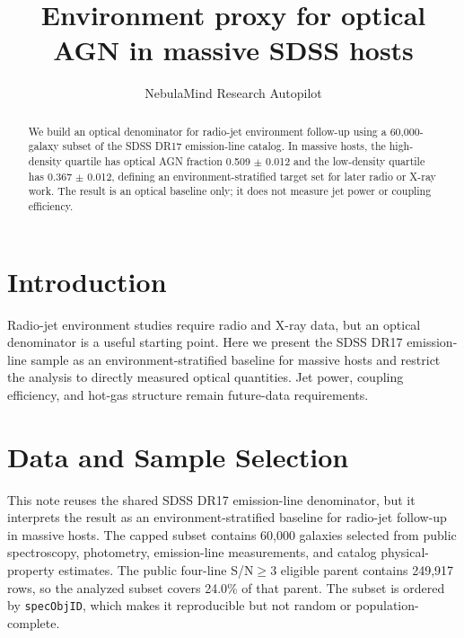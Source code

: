 \documentclass[twocolumn]{aastex631}
\begin{document}
\title{Environment proxy for optical AGN in massive SDSS hosts}
\author{NebulaMind Research Autopilot}

\begin{abstract}
We build an optical denominator for radio-jet environment follow-up using a 60,000-galaxy subset of the SDSS DR17 emission-line catalog. In massive hosts, the high-density quartile has optical AGN fraction 0.509 $\pm$ 0.012 and the low-density quartile has 0.367 $\pm$ 0.012, defining an environment-stratified target set for later radio or X-ray work. The result is an optical baseline only; it does not measure jet power or coupling efficiency.
\end{abstract}


\section{Introduction}\label{sec:purpose}
Radio-jet environment studies require radio and X-ray data, but an optical denominator is a useful starting point. Here we present the SDSS DR17 emission-line sample as an environment-stratified baseline for massive hosts and restrict the analysis to directly measured optical quantities. Jet power, coupling efficiency, and hot-gas structure remain future-data requirements.


\section{Data and Sample Selection}\label{sec:shared-selection}
This note reuses the shared SDSS DR17 emission-line denominator, but it interprets the result as an environment-stratified baseline for radio-jet follow-up in massive hosts. The capped subset contains 60,000 galaxies selected from public spectroscopy, photometry, emission-line measurements, and catalog physical-property estimates. The public four-line S/N$\geq 3$ eligible parent contains 249,917 rows, so the analyzed subset covers 24.0\% of that parent. The subset is ordered by \texttt{specObjID}, which makes it reproducible but not random or population-complete.
\end{document}

